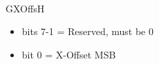 \\
GXOffsH
\begin{itemize}
\item bits 7-1 = Reserved, must be 0
\item bit 0 = X-Offset MSB
\end{itemize}

